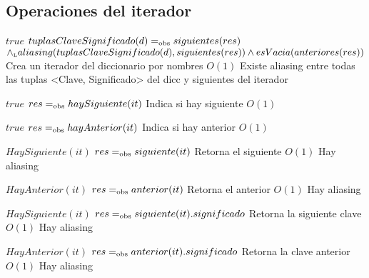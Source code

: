 


\subsection{Operaciones del iterador}
 {$true$}
 {$tuplasClaveSignificado(d) =_{\mathrm{obs}} siguientes(res)$ \\$\land_{\mathrm{\scriptscriptstyle{L}}} aliasing(tuplasClaveSignificado(d),siguientes(res)) \land esVacia(anteriores(res))$}
 {Crea un iterador del diccionario por nombres}
 {$O(1)$}
 {Existe aliasing entre todas las tuplas <Clave, Significado> del dicc y siguientes del iterador}

 {$true$}
 {$res =_{\mathrm{obs}} haySiguiente(it)$}
 {Indica si hay siguiente}
 {$O(1)$}
 {}

 {$true$}
 {$res =_{\mathrm{obs}} hayAnterior(it)$}
 {Indica si hay anterior}
 {$O(1)$}
 {}

 {$HaySiguiente(it)$}
 {$res =_{\mathrm{obs}} siguiente(it)$}
 {Retorna el siguiente}
 {$O(1)$}
 {Hay aliasing}

 {$HayAnterior(it)$}
 {$res =_{\mathrm{obs}} anterior(it)$}
 {Retorna el anterior}
 {$O(1)$}
 {Hay aliasing}

 {$HaySiguiente(it)$}
 {$res =_{\mathrm{obs}} siguiente(it).significado$}
 {Retorna la siguiente clave}
 {$O(1)$}
 {Hay aliasing}

 {$HayAnterior(it)$}
 {$res =_{\mathrm{obs}} anterior(it).significado$}
 {Retorna la clave anterior}
 {$O(1)$}
 {Hay aliasing}

